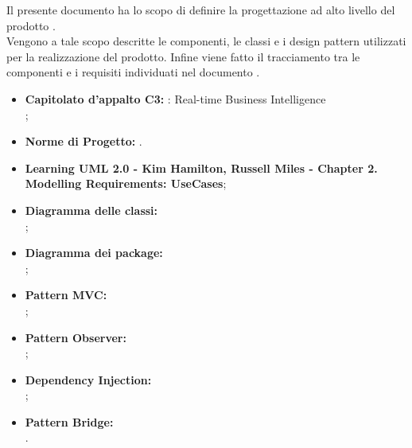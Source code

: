 
		Il presente documento ha lo scopo di definire la progettazione ad alto livello del prodotto \projectname{}.\\
		Vengono a tale scopo descritte le componenti, le classi e i design pattern utilizzati per la realizzazione del prodotto. Infine viene fatto il tracciamento tra le componenti e i requisiti individuati nel documento .

	

		\begin{itemize}
			\item\textbf{Capitolato d'appalto C3:} \projectname{}: Real-time Business Intelligence \\
				;
			\item \textbf{Norme di Progetto:} .
		\end{itemize}
		\begin{itemize}
			\item \textbf{Learning UML 2.0 - Kim Hamilton, Russell Miles - Chapter 2. Modelling Requirements: UseCases};
			\item \textbf{Diagramma delle classi:} \\ ;
			\item \textbf{Diagramma dei package:} \\ ;
			\item \textbf{Pattern MVC:} \\ ;
			\item \textbf{Pattern Observer:} \\ ;
			\item \textbf{Dependency Injection:} \\ ;
			\item \textbf{Pattern Bridge:} \\ .
			
		\end{itemize}
